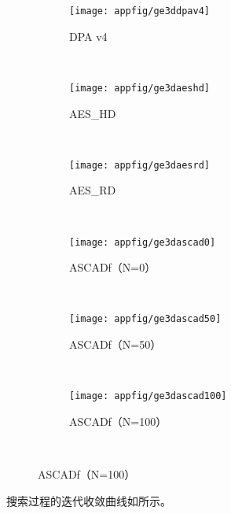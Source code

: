 {	\begin{figure}[!h]
		\centering
		\begin{subfigure}[b]{\trif\textwidth}
			\texttt{[image: appfig/ge3ddpav4]}
			\caption{DPA v4}
			\label{fig:ge3ddpav4}
		\end{subfigure}%
		~%
		\begin{subfigure}[b]{\trif\textwidth}
			\texttt{[image: appfig/ge3daeshd]}
			\caption{AES\_HD}
			\label{fig:ge3daeshd}
		\end{subfigure}
		~%
		\begin{subfigure}[b]{\trif\textwidth}
			\texttt{[image: appfig/ge3daesrd]}
			\caption{AES\_RD}
			\label{fig:ge3daesrd}
		\end{subfigure}
		\\%
		\begin{subfigure}[b]{\trif\textwidth}
			\texttt{[image: appfig/ge3dascad0]}
			\caption{ASCADf（N=0）}
			\label{fig:ge3dascad0}
		\end{subfigure}%
		~%
		\begin{subfigure}[b]{\trif\textwidth}
			\texttt{[image: appfig/ge3dascad50]}
			\caption{ASCADf（N=50）}
			\label{fig:ge3dascad50}
		\end{subfigure}
		~%
		\begin{subfigure}[b]{\trif\textwidth}
			\texttt{[image: appfig/ge3dascad100]}
			\caption{ASCADf（N=100）}
			\label{fig:ge3dascad100}
		\end{subfigure}
		\\%
		\label{appfig:ge3d}
	\end{figure}
	
	搜索过程的迭代收敛曲线如所示。
	
}

